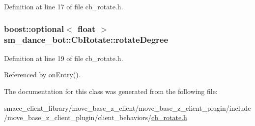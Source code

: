 Definition at line 17 of file cb\+\_\+rotate.\+h.

\subsubsection[{\texorpdfstring{rotate\+Degree}{rotateDegree}}]{\setlength{\rightskip}{0pt plus 5cm}boost\+::optional$<$ float $>$ sm\+\_\+dance\+\_\+bot\+::\+Cb\+Rotate\+::rotate\+Degree}\hypertarget{classsm__dance__bot_1_1CbRotate_afc9a39441200364bc1f503e57a48a4ba}{}\label{classsm__dance__bot_1_1CbRotate_afc9a39441200364bc1f503e57a48a4ba}


Definition at line 19 of file cb\+\_\+rotate.\+h.



Referenced by on\+Entry().



The documentation for this class was generated from the following file\+:\begin{DoxyCompactItemize}
\item 
smacc\+\_\+client\+\_\+library/move\+\_\+base\+\_\+z\+\_\+client/move\+\_\+base\+\_\+z\+\_\+client\+\_\+plugin/include/move\+\_\+base\+\_\+z\+\_\+client\+\_\+plugin/client\+\_\+behaviors/\hyperlink{smacc__client__library_2move__base__z__client_2move__base__z__client__plugin_2include_2move__bas2ff277154dfb9bba8a39d43e74a5a16e}{cb\+\_\+rotate.\+h}\end{DoxyCompactItemize}
